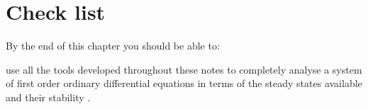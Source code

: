 \section{Check list}
By the end of this chapter you should be able to:
\begin{todolist}
\item use all the tools developed throughout these notes to completely analyse a system of first order ordinary differential equations in terms of the steady states available and their stability .
\end{todolist}





